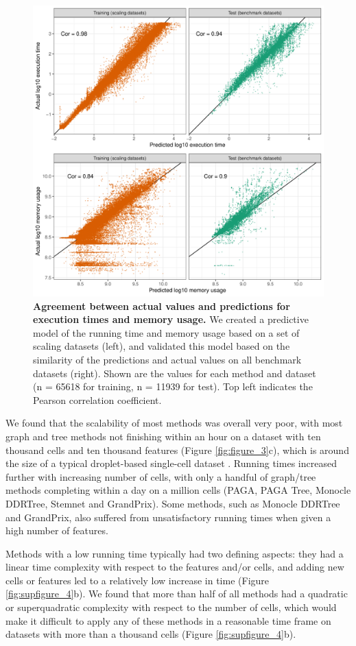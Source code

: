 \begin{figure}[tbh!]
	\centering\includegraphics[width=0.6\linewidth]{fig/supfigure_5.png}
	\caption{
		\textbf{Agreement between actual values and predictions for execution times and memory usage.}
		We created a predictive model of the running time and memory usage based on a set of scaling datasets (left), and validated this model based on the similarity of the predictions and actual values on all benchmark datasets (right). Shown are the values for each method and dataset (n = 65618 for training, n = 11939 for test). Top left indicates the Pearson correlation coefficient.
	}
	\label{fig:supfigure_5}
\end{figure}

We found that the scalability of most methods was overall very poor, with most graph and tree methods not finishing within an hour on a dataset with ten thousand cells and ten thousand features (Figure \ref{fig:figure_3}c), which is around the size of a typical droplet-based single-cell dataset \cite{svensson_exponentialscalingsinglecell_2018}. Running times increased further with increasing number of cells, with only a handful of graph/tree methods completing within a day on a million cells (PAGA, PAGA Tree, Monocle DDRTree, Stemnet and GrandPrix). Some methods, such as Monocle DDRTree and GrandPrix, also suffered from unsatisfactory running times when given a high number of features.

Methods with a low running time typically had two defining aspects: they had a linear time complexity with respect to the features and/or cells, and adding new cells or features led to a relatively low increase in time (Figure \ref{fig:supfigure_4}b). We found that more than half of all methods had a quadratic or superquadratic complexity with respect to the number of cells, which would make it difficult to apply any of these methods in a reasonable time frame on datasets with more than a thousand cells (Figure \ref{fig:supfigure_4}b).


